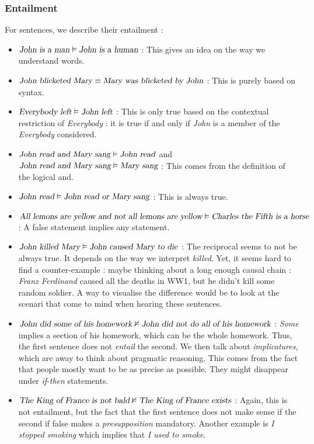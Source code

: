 \documentclass{cours}
\begin{document}
\subsubsection{Entailment}
For sentences, we describe their entailment\! :
\begin{itemize}
    \item $\textsl{John is a man} \vDash \textsl{John is a human}$\! : This gives an idea on the way we understand words.
    \item $\textsl{John blicketed Mary} \equiv \textsl{Mary was blicketed by John}$\! : This is purely based on syntax.
    \item $\textsl{Everybody left} \vDash \textsl{John left}$\! : This is only true based on the contextual restriction of \textsl{Everybody}\! : it is true if and only if \textsl{John} is a member of the \textsl{Everybody} considered.
    \item $\textsl{John read and Mary sang} \vDash \textsl{John read}$ and $\textsl{John read and Mary sang} \vDash \textsl{Mary sang}$\! : This comes from the definition of the logical and.
    \item $\textsl{John read} \vDash \textsl{John read or Mary sang}$\! : This is always true.
    \item $\textsl{All lemons are yellow and not all lemons are yellow} \vDash \textsl{Charles the Fifth is a horse}$\! : A false statement implies any statement.
    \item $\textsl{John killed Mary} \vDash \textsl{John caused Mary to die}$\! : The reciprocal seems to not be always true. It depends on the way we interpret \textsl{killed}. Yet, it seems hard to find a counter-example\! : maybe thinking about a long enough causal chain\! : \textsl{Franz Ferdinand} caused all the deaths in WW1, but he didn't kill some random soldier. A way to visualise the difference would be to look at the scenari that come to mind when hearing these sentences.
    \item $\textsl{John did some of his homework} \nvDash \textsl{John did not do all of his homework}$\! : \textsl{Some} implies a section of his homework, which can be the whole homework. Thus, the first sentence does not \emph{entail} the second. We then talk about \emph{implicatures}, which are away to think about pragmatic reasoning. This comes from the fact that people mostly want to be as precise as possible. They might disappear under \textsl{if}-\textsl{then} statements.
    \item $\textsl{The King of France is not bald} \nvDash \textsl{The King of France exists}$\! : Again, this is not entailment, but the fact that the first sentence does not make sense if the second if false makes a \emph{presupposition} mandatory. Another example is \textsl{I stopped smoking} which implies that \textsl{I used to smoke}.
\end{itemize}
\end{document}

